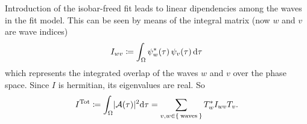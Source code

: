 Introduction of the isobar-freed fit leads to linear dipendencies among the waves in the fit model.
This can be seen by means of the integral matrix (now $w$ and $v$ are wave indices)
\begin{equation}
    I_{wv} \coloneqq \int_\Omega \psi_w^*(\tau)\,\psi_v(\tau)\mathop{}\!\textup{d}\tau
\end{equation}
which represents the integrated overlap of the waves $w$ and $v$ over the phase space.
Since $I$ is hermitian, its eigenvalues are real.
So
\begin{equation}
    I^{\text{Tot}} \coloneqq \int_\Omega \lvert\mathcal{A}(\tau)\rvert^2\!\mathop{}\!\textup{d} \tau = \sum_{v,w \in \Set{\text{waves}}} T_w^* I_{wv} T_v.
\end{equation}
